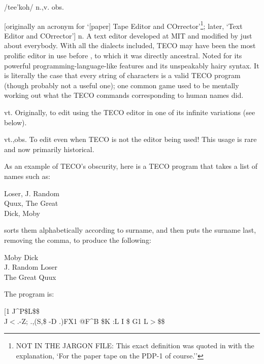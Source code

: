  /tee'koh/ n.,v. obs.

\begin{inparaenum}
	\item {[}originally an acronym for `[paper] Tape Editor and COrrector'\footnote{NOT IN THE JARGON FILE: This exact definition was
		quoted in  with the
		explanation, `For the paper tape on the PDP-1 of course.''}; later, `Text Editor and COrrector'] n. A text editor developed at MIT
		and modified by just about everybody. With all the dialects included, TECO may have been the most prolific editor in use before
		, to which it was directly ancestral. Noted for its powerful programming-language-like features and its
		unspeakably hairy syntax. It is literally the case that every string of characters is a valid TECO program (though probably not a
		useful one); one common game used to be mentally working out what the TECO commands corresponding to human names did.
	\item vt. Originally, to edit using the TECO editor in one of its infinite variations (see below).
	\item vt.,obs. To edit even when TECO is not the editor being used! This usage is rare and now primarily historical.
\end{inparaenum}

As an example of TECO's obscurity, here is a TECO program that takes a list of names such as:

\begin{code}
	Loser, J. Random\\
	Quux, The Great\\
	Dick, Moby
\end{code}

sorts them alphabetically according to surname, and then puts the surname last, removing the comma, to produce the following:

\begin{code}
	Moby Dick\\
	J. Random Loser\\
	The Great Quux
\end{code}

The program is:

\begin{code}
	[1 J\^{}P\$L\$\$\\
	J$<$.-Z; .,(S,\$ -D .)FX1 @F\^{}B \$K :L I \$ G1 L$>$\$\$
\end{code}

